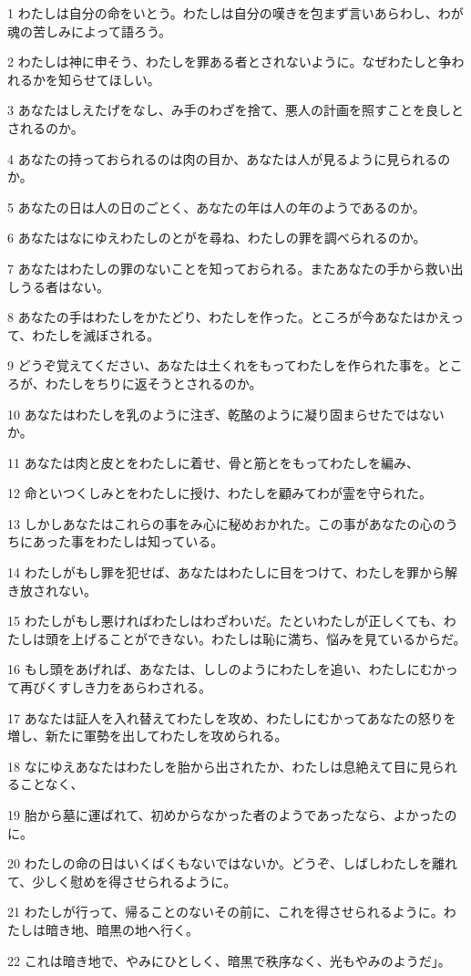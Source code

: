 \par 1 わたしは自分の命をいとう。わたしは自分の嘆きを包まず言いあらわし、わが魂の苦しみによって語ろう。
\par 2 わたしは神に申そう、わたしを罪ある者とされないように。なぜわたしと争われるかを知らせてほしい。
\par 3 あなたはしえたげをなし、み手のわざを捨て、悪人の計画を照すことを良しとされるのか。
\par 4 あなたの持っておられるのは肉の目か、あなたは人が見るように見られるのか。
\par 5 あなたの日は人の日のごとく、あなたの年は人の年のようであるのか。
\par 6 あなたはなにゆえわたしのとがを尋ね、わたしの罪を調べられるのか。
\par 7 あなたはわたしの罪のないことを知っておられる。またあなたの手から救い出しうる者はない。
\par 8 あなたの手はわたしをかたどり、わたしを作った。ところが今あなたはかえって、わたしを滅ぼされる。
\par 9 どうぞ覚えてください、あなたは土くれをもってわたしを作られた事を。ところが、わたしをちりに返そうとされるのか。
\par 10 あなたはわたしを乳のように注ぎ、乾酪のように凝り固まらせたではないか。
\par 11 あなたは肉と皮とをわたしに着せ、骨と筋とをもってわたしを編み、
\par 12 命といつくしみとをわたしに授け、わたしを顧みてわが霊を守られた。
\par 13 しかしあなたはこれらの事をみ心に秘めおかれた。この事があなたの心のうちにあった事をわたしは知っている。
\par 14 わたしがもし罪を犯せば、あなたはわたしに目をつけて、わたしを罪から解き放されない。
\par 15 わたしがもし悪ければわたしはわざわいだ。たといわたしが正しくても、わたしは頭を上げることができない。わたしは恥に満ち、悩みを見ているからだ。
\par 16 もし頭をあげれば、あなたは、ししのようにわたしを追い、わたしにむかって再びくすしき力をあらわされる。
\par 17 あなたは証人を入れ替えてわたしを攻め、わたしにむかってあなたの怒りを増し、新たに軍勢を出してわたしを攻められる。
\par 18 なにゆえあなたはわたしを胎から出されたか、わたしは息絶えて目に見られることなく、
\par 19 胎から墓に運ばれて、初めからなかった者のようであったなら、よかったのに。
\par 20 わたしの命の日はいくばくもないではないか。どうぞ、しばしわたしを離れて、少しく慰めを得させられるように。
\par 21 わたしが行って、帰ることのないその前に、これを得させられるように。わたしは暗き地、暗黒の地へ行く。
\par 22 これは暗き地で、やみにひとしく、暗黒で秩序なく、光もやみのようだ」。

